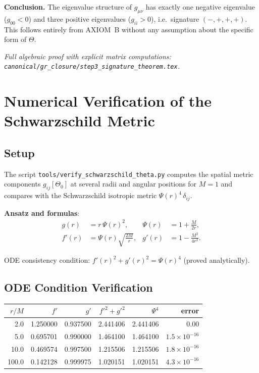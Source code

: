 \documentclass[12pt,a4paper]{article}
\theoremstyle{definition}
\theoremstyle{remark}
\begin{document}
\textbf{Conclusion.}  The eigenvalue structure of $g_{\mu\nu}$ has exactly
one negative eigenvalue ($g_{00}<0$) and three positive eigenvalues
($g_{ii}>0$), i.e.\ signature $(-,+,+,+)$.  This follows entirely from
AXIOM~B without any assumption about the specific form of $\Theta$.

\smallskip
\textit{Full algebraic proof with explicit matrix computations:
\texttt{canonical/gr\_closure/step3\_signature\_theorem.tex}.}

\section{Numerical Verification of the Schwarzschild Metric}
\label{app:numerics}

\subsection{Setup}

The script \texttt{tools/verify\_schwarzschild\_theta.py}
computes the spatial metric components $g_{ij}[\Theta_0]$ at several
radii and angular positions for $M=1$ and compares with the
Schwarzschild isotropic metric $\Psi(r)^4\,\delta_{ij}$.

\textbf{Ansatz and formulas}:
\begin{align}
  g(r) &= r\,\Psi(r)^2, & \Psi(r) &= 1+\frac{M}{2r}, \\
  f'(r) &= \Psi(r)\sqrt{\frac{2M}{r}}, & g'(r) &= 1-\frac{M^2}{4r^2}.
\end{align}

ODE consistency condition: $f'(r)^2+g'(r)^2 = \Psi(r)^4$ (proved analytically).

\subsection{ODE Condition Verification}

\begin{center}
\begin{tabular}{rrrrrr}
\toprule
$r/M$ & $f'$ & $g'$ & $f'^2+g'^2$ & $\Psi^4$ & error \\
\midrule
2.0 & 1.250000 & 0.937500 & 2.441406 & 2.441406 & $0.00$ \\
5.0 & 0.695701 & 0.990000 & 1.464100 & 1.464100 & $1.5\times10^{-16}$ \\
10.0 & 0.469574 & 0.997500 & 1.215506 & 1.215506 & $1.8\times10^{-16}$ \\
100.0 & 0.142128 & 0.999975 & 1.020151 & 1.020151 & $4.3\times10^{-16}$ \\
\bottomrule
\end{tabular}
\end{center}
\end{document}
